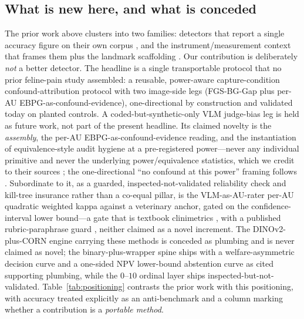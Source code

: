 \subsection{What is new here, and what is conceded}
The prior work above clusters into two families: detectors that report a single
accuracy figure on their own corpus
\cite{steagall2023,feighelstein2023}, and the instrument/measurement context
that frames them \cite{evangelista2019,leesteagall2026,chavoshi2025} plus the
landmark scaffolding \cite{martvel2024catflw}. Our contribution is deliberately
\emph{not} a better detector. The headline is a single transportable protocol
that no prior feline-pain study assembled: a reusable, power-aware
capture-condition confound-attribution protocol with two image-side legs
(FGS-BG-Gap plus per-AU EBPG-as-confound-evidence), one-directional by
construction and validated today on planted controls. A coded-but-synthetic-only
VLM judge-bias leg is held as future work, not part of the present headline. Its claimed novelty is the
\emph{assembly}, the per-AU EBPG-as-confound-evidence reading, and the
instantiation of equivalence-style audit hygiene at a pre-registered
power---never any individual primitive
\cite{xiao2021noise,moayeri2022comprehensive,wang2020scorecam} and never the
underlying power/equivalence statistics, which we credit to their sources
\cite{huanghooker2026fairness,singh2023samplesize}; the one-directional
\enquote{no confound at this power} framing follows
\cite{adebayo2022posthoc}.
Subordinate to it, as a guarded, inspected-not-validated reliability check and
kill-tree insurance rather than a co-equal pillar, is the VLM-as-AU-rater per-AU
quadratic weighted kappa against a veterinary anchor, gated on the
confidence-interval lower bound---a gate that is textbook clinimetrics
\cite{tractenberg2010kappa,donner2010kappa,rotondi2012kappa,rotondi2018kappasize,simwright2005kappa},
with a published rubric-paraphrase guard \cite{weng2026policy}, neither claimed
as a novel increment. The DINOv2-plus-CORN engine carrying these methods is conceded as
plumbing and is never claimed as novel; the binary-plus-wrapper spine ships with
a welfare-asymmetric decision curve and a one-sided NPV lower-bound abstention
curve as cited supporting plumbing, while the $0$--$10$ ordinal layer ships
inspected-but-not-validated.
Table~\ref{tab:positioning} contrasts the prior work with this positioning, with
accuracy treated explicitly as an anti-benchmark and a column marking whether a
contribution is a \emph{portable method}.

